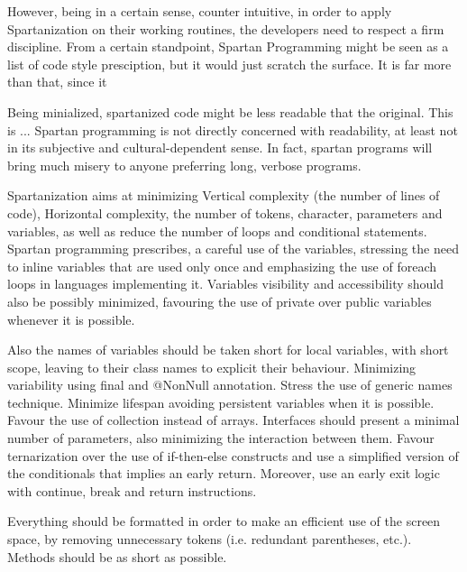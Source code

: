 However, being in a certain sense, counter intuitive, in order to apply
Spartanization on their working routines, the developers need to respect a firm
discipline.  From a certain standpoint, Spartan Programming might be seen as a
list of code style presciption, but it would just scratch the surface.  It is
far more than that, since it 

Being minialized, spartanized code might be less readable that the original.
This is ...  Spartan programming is not directly concerned with readability, at
least not in its subjective and cultural-dependent sense. In fact, spartan
programs will bring much misery to anyone preferring long, verbose programs.

Spartanization aims at minimizing Vertical complexity (the number of lines of code), 
Horizontal complexity, the number of tokens, character, parameters and variables, 
as well as reduce the number of loops and conditional statements.
Spartan programming prescribes, a careful use of the variables, stressing the need 
to inline variables that are used only once and emphasizing the use of foreach loops 
in languages implementing it. Variables visibility and accessibility should also be 
possibly minimized, favouring the use of private over public variables whenever it 
is possible. 

Also the names of variables should be taken short for local variables, with short scope, 
leaving to their class names to explicit their behaviour. Minimizing variability using 
final and @NonNull annotation. Stress the use of generic names technique. Minimize lifespan 
avoiding persistent variables when it is possible. Favour the use of collection instead 
of arrays. Interfaces should present a minimal number of parameters, also minimizing 
the interaction between them. Favour ternarization over the use of if-then-else constructs 
and use a simplified version of the conditionals that implies an early return. Moreover, 
use an early exit logic with continue, break and return instructions. 

Everything should be formatted in order to make an efficient use of the screen space, 
by removing unnecessary tokens (i.e. redundant parentheses, etc.). 
Methods should be as short as possible. 

